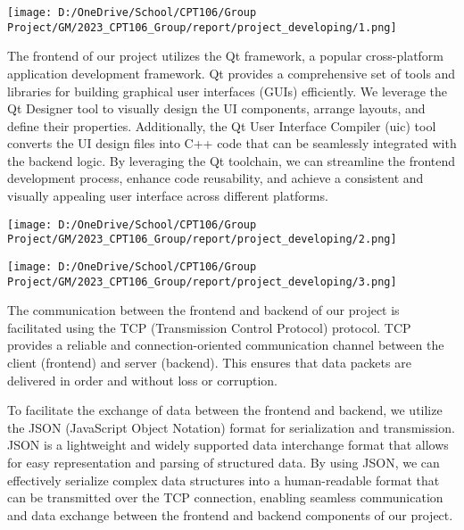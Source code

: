 {\begin{center}
  \centering
  \texttt{[image: D:/OneDrive/School/CPT106/Group Project/GM/2023\_CPT106\_Group/report/project\_developing/1.png]}
\end{center}


The frontend of our project utilizes the Qt framework, a popular
cross-platform application development framework. Qt provides a
comprehensive set of tools and libraries for building graphical user
interfaces (GUIs) efficiently. We leverage the Qt Designer tool to
visually design the UI components, arrange layouts, and define their
properties. Additionally, the Qt User Interface Compiler (uic) tool
converts the UI design files into C++ code that can be seamlessly
integrated with the backend logic. By leveraging the Qt toolchain, we
can streamline the frontend development process, enhance code
reusability, and achieve a consistent and visually appealing user
interface across different platforms.

\begin{center}
  \centering
  \texttt{[image: D:/OneDrive/School/CPT106/Group Project/GM/2023\_CPT106\_Group/report/project\_developing/2.png]}
\end{center}

\begin{center}
  \centering
  \texttt{[image: D:/OneDrive/School/CPT106/Group Project/GM/2023\_CPT106\_Group/report/project\_developing/3.png]}
\end{center}

The communication between the frontend and backend of our project is
facilitated using the TCP (Transmission Control Protocol) protocol. TCP
provides a reliable and connection-oriented communication channel
between the client (frontend) and server (backend). This ensures that
data packets are delivered in order and without loss or corruption.

To facilitate the exchange of data between the frontend and backend, we
utilize the JSON (JavaScript Object Notation) format for serialization
and transmission. JSON is a lightweight and widely supported data
interchange format that allows for easy representation and parsing of
structured data. By using JSON, we can effectively serialize complex
data structures into a human-readable format that can be transmitted
over the TCP connection, enabling seamless communication and data
exchange between the frontend and backend components of our project.

}
